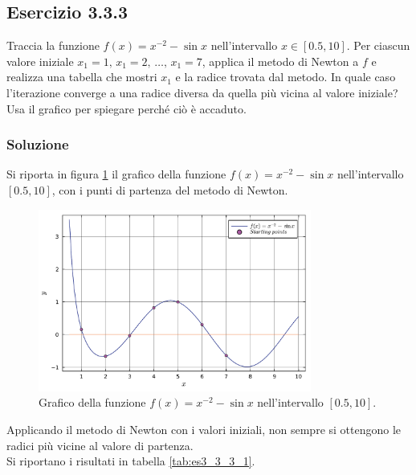 \documentclass[letterpaper, 12pt]{article}
\begin{document}
\subsection{Esercizio 3.3.3}
\label{sec:333}
Traccia la funzione $f(x)=x^{-2} - \sin x$ nell'intervallo $x \in [0.5,10]$.  
Per ciascun valore iniziale $x_1=1,\, x_1=2,\,\ldots,\, x_1=7$, applica il metodo di Newton a $f$  
e realizza una tabella che mostri $x_1$ e la radice trovata dal metodo.  
In quale caso l'iterazione converge a una radice diversa da quella più vicina al valore iniziale?  
Usa il grafico per spiegare perché ciò è accaduto.

\subsubsection{Soluzione}
Si riporta in figura \ref{fig:es3_3_3_1} il grafico della funzione $f(x)=x^{-2} - \sin x$ nell'intervallo
$[0.5,10]$, con i punti di partenza del metodo di Newton. 
\begin{figure}[!ht]
    \centering
    \includegraphics[width=0.8\textwidth]{3331.pdf}
    \caption{Grafico della funzione $f(x)=x^{-2} - \sin x$ nell'intervallo $[0.5,10]$.}
    \label{fig:es3_3_3_1}
\end{figure}

Applicando il metodo di Newton con i valori iniziali, non sempre si ottengono le radici più vicine al valore
di partenza. \\
Si riportano i risultati in tabella \ref{tab:es3_3_3_1}.
\end{document}
